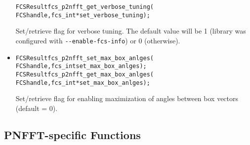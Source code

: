 \begin{itemize}
\begin{alltt}
FCSResult fcs_p2nfft_get_verbose_tuning(
    FCS handle, fcs_int* set_verbose_tuning);
\end{alltt}
    Set/retrieve flag for verbose tuning. The default value will be 1 (library was configured with \verb!--enable-fcs-info!) or 0 (otherwise).
  \item
\begin{alltt}
FCSResult fcs_p2nfft_set_max_box_anlges(
    FCS handle, fcs_int set_max_box_anlges);
FCSResult fcs_p2nfft_get_max_box_anlges(
    FCS handle, fcs_int* set_max_box_anlges);
\end{alltt}
  Set/retrieve flag for enabling maximization of angles between box vectors (default = 0). 
\end{itemize}

\subsection{PNFFT-specific Functions}
